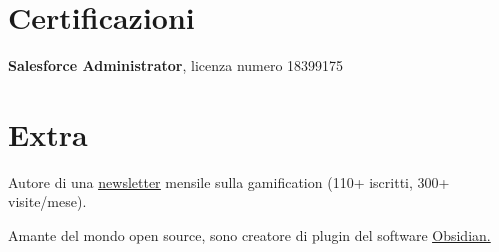 \documentclass[11pt]{article}
\newcommand{\bodySize}{\small}
\newcommand{\resumeItem}[1]{\item \bodySize #1}
\begin{document}
\section{Certificazioni}
\begin{resumeList}
  \resumeItem{\textbf{Salesforce Administrator}, licenza numero 18399175}
\end{resumeList}

\section{Extra}
\begin{resumeList}
  \resumeItem{Autore di una \href{https://giacomification.substack.com/}{\underline{newsletter}} mensile sulla gamification (110+ iscritti, 300+ visite/mese).}
  \resumeItem{Amante del mondo open source, sono creatore di plugin del software \href{https://community.obsidian.md/users/jackydangelo}{\underline{Obsidian}.}}
\end{resumeList}

\end{document}
